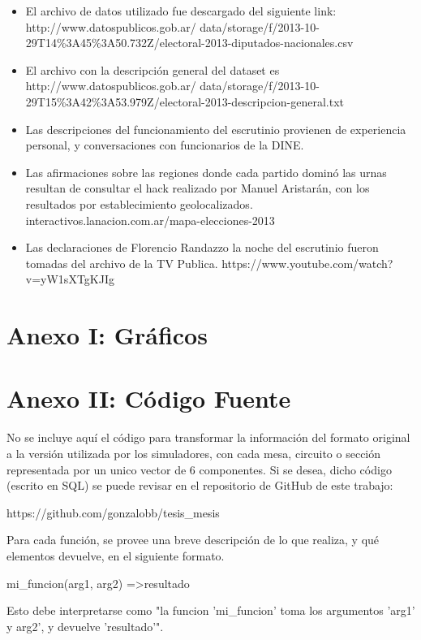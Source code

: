 \documentclass[12pt, a4paper]{article}
\begin{document}
\begin{itemize}
	\item El archivo de datos utilizado fue descargado del siguiente link: http://www.datospublicos.gob.ar/
		data/storage/f/2013-10-29T14\%3A45\%3A50.732Z/electoral-2013-diputados-nacionales.csv
	\item El archivo con la descripci\'on general del dataset es http://www.datospublicos.gob.ar/
		data/storage/f/2013-10-29T15\%3A42\%3A53.979Z/electoral-2013-descripcion-general.txt
	\item Las descripciones del funcionamiento del escrutinio provienen de experiencia personal, y conversaciones con funcionarios de la DINE.
	\item Las afirmaciones sobre las regiones donde cada partido domin\'o las urnas resultan de consultar el hack realizado por Manuel Aristar\'an, con los resultados por establecimiento geolocalizados. interactivos.lanacion.com.ar/mapa-elecciones-2013
	\item Las declaraciones de Florencio Randazzo la noche del escrutinio fueron tomadas del archivo de la TV Publica. https://www.youtube.com/watch?v=yW1sXTgKJIg
\end{itemize}

\section{Anexo I: Gr\'aficos}







\section{Anexo II: C\'odigo Fuente}

No se incluye aqu\'i el c\'odigo para transformar la informaci\'on del formato original a la versi\'on utilizada por los simuladores, con cada mesa, circuito o secci\'on representada por un unico vector de 6 componentes. Si se desea, dicho c\'odigo (escrito en SQL) se puede revisar en el repositorio de GitHub de este trabajo:
\begin{center}
https://github.com/gonzalobb/tesis\_mesis 
\end{center}

Para cada funci\'on, se provee una breve descripci\'on de lo que realiza, y qu\'e elementos devuelve, en el siguiente formato.
\begin{center}
mi\_funcion(arg1, arg2) =\textgreater resultado
\end{center}
Esto debe interpretarse como "la funcion 'mi\_funcion' toma los argumentos 'arg1' y arg2', y devuelve 'resultado'".
\end{document}
